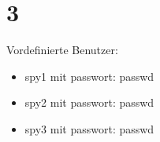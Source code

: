 \documentclass[ngerman]{scrartcl}
\begin{document}
\section*{3}
  Vordefinierte Benutzer: \\
  \begin{itemize}
	\item spy1 mit passwort: passwd
	\item spy2 mit passwort: passwd
	\item spy3 mit passwort: passwd
  \end{itemize}
\end{document}

